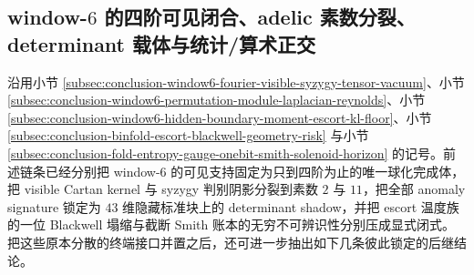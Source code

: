 \subsection{window-\texorpdfstring{$6$}{6} 的四阶可见闭合、adelic 素数分裂、determinant 载体与统计/算术正交}\label{subsec:conclusion-window6-design-adelic-determinant-statistical-separation}
沿用小节 \ref{subsec:conclusion-window6-fourier-visible-syzygy-tensor-vacuum}、小节 \ref{subsec:conclusion-window6-permutation-module-laplacian-reynolds}、小节 \ref{subsec:conclusion-window6-hidden-boundary-moment-escort-kl-floor}、小节 \ref{subsec:conclusion-binfold-escort-blackwell-geometry-risk} 与小节 \ref{subsec:conclusion-fold-entropy-gauge-onebit-smith-solenoid-horizon} 的记号。前述链条已经分别把 window-\(6\) 的可见支持固定为只到四阶为止的唯一球化完成体，把 visible Cartan kernel 与 syzygy 判别阴影分裂到素数 \(2\) 与 \(11\)，把全部 anomaly signature 锁定为 \(43\) 维隐藏标准块上的 determinant shadow，并把 escort 温度族的一位 Blackwell 塌缩与截断 Smith 账本的无穷不可辨识性分别压成显式闭式。把这些原本分散的终端接口并置之后，还可进一步抽出如下几条彼此锁定的后继结论。

